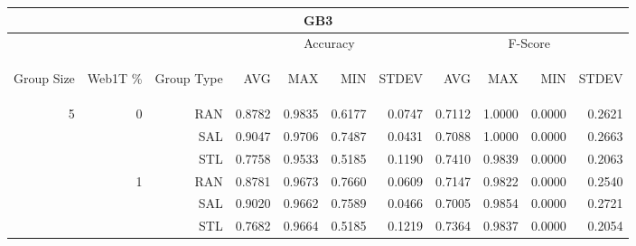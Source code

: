 \begin{center}
\begin{table}[htbp] 
 \begin{center}
\begin{tabular}{ | r | r | r | r | r | r | r | r | r | r | r |}
\hline
\multicolumn{11}{|c|}{GB3}\\
\hline
 & & & \multicolumn{4}{|c|}{Accuracy} & \multicolumn{4}{|c|}{F-Score}\\ \cline{4-11}
\begin{sideways}Group Size\end{sideways} & \begin{sideways}Web1T \%\end{sideways} & \begin{sideways}Group Type\end{sideways} & \begin{sideways}AVG\end{sideways} & \begin{sideways}MAX\end{sideways} & \begin{sideways}MIN\end{sideways} & \begin{sideways}STDEV\end{sideways} & \begin{sideways}AVG\end{sideways} & \begin{sideways}MAX\end{sideways} & \begin{sideways}MIN\end{sideways} & \begin{sideways}STDEV\end{sideways}\\
\hline
\multirow{18}{*}{5}
 & \multirow{3}{*}{0} & RAN & 0.8782 & 0.9835 & 0.6177 & 0.0747 & 0.7112 & 1.0000 & 0.0000 & 0.2621\\ \cline{3-11}
 &   & SAL & 0.9047 & 0.9706 & 0.7487 & 0.0431 & 0.7088 & 1.0000 & 0.0000 & 0.2663\\ \cline{3-11}
 &   & STL & 0.7758 & 0.9533 & 0.5185 & 0.1190 & 0.7410 & 0.9839 & 0.0000 & 0.2063\\ \cline{2-11}
 & \multirow{3}{*}{1} & RAN & 0.8781 & 0.9673 & 0.7660 & 0.0609 & 0.7147 & 0.9822 & 0.0000 & 0.2540\\ \cline{3-11}
 &   & SAL & 0.9020 & 0.9662 & 0.7589 & 0.0466 & 0.7005 & 0.9854 & 0.0000 & 0.2721\\ \cline{3-11}
 &   & STL & 0.7682 & 0.9664 & 0.5185 & 0.1219 & 0.7364 & 0.9837 & 0.0000 & 0.2054\\ \cline{2-11}

\end{tabular}
\end{center}
\end{table}
\end{center}

